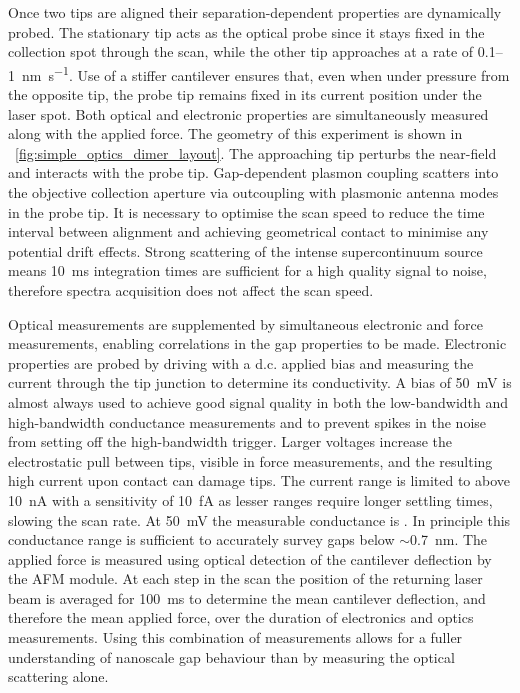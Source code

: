 \documentclass[a4paper]{article}
\begin{document}
Once two tips are aligned their separation-dependent properties are dynamically probed. The stationary tip acts as the optical probe since it stays fixed in the collection spot through the scan, while the other tip approaches at a rate of 0.1--\SI{1}{\nano\metre\per\second}. Use of a stiffer cantilever ensures that, even when under pressure from the opposite tip, the probe tip remains fixed in its current position under the laser spot. Both optical and electronic properties are simultaneously measured along with the applied force. The geometry of this experiment is shown in \figurename~\ref{fig:simple_optics_dimer_layout}.
The approaching tip perturbs the near-field and interacts with the probe tip. Gap-dependent plasmon coupling scatters into the objective collection aperture via outcoupling with plasmonic antenna modes in the probe tip. It is necessary to optimise the scan speed to reduce the time interval between alignment and achieving geometrical contact to minimise any potential drift effects. Strong scattering of the intense supercontinuum source means  \SI{10}{ms} integration times are sufficient for a high quality signal to noise, therefore spectra acquisition does not affect the scan speed. %

Optical measurements are supplemented by simultaneous electronic and force measurements, enabling correlations in the gap properties to be made.
Electronic properties are probed by driving with a d.c. applied bias and measuring the current through the tip junction to determine its conductivity. A bias of \SI{50}{mV} is almost always used to achieve good signal quality in both the low-bandwidth and high-bandwidth conductance measurements and to prevent spikes in the noise from setting off the high-bandwidth trigger. Larger voltages increase the electrostatic pull between tips, visible in force measurements, and the resulting high current upon contact can damage tips. The current range is limited to above \SI{10}{nA} with a sensitivity of \SI{10}{fA} as lesser ranges require longer settling times, slowing the scan rate. At \SI{50}{mV} the measurable conductance is . In principle this conductance range is sufficient to accurately survey gaps below $\sim$\SI{0.7}{nm}.
The applied force is measured using optical detection of the cantilever deflection by the AFM module. At each step in the scan the position of the returning laser beam is averaged for \SI{100}{ms} to determine the mean cantilever deflection, and therefore the mean applied force, over the duration of electronics and optics measurements. %
Using this combination of measurements allows for a fuller understanding of nanoscale gap behaviour than by measuring the optical scattering alone.
\end{document}
